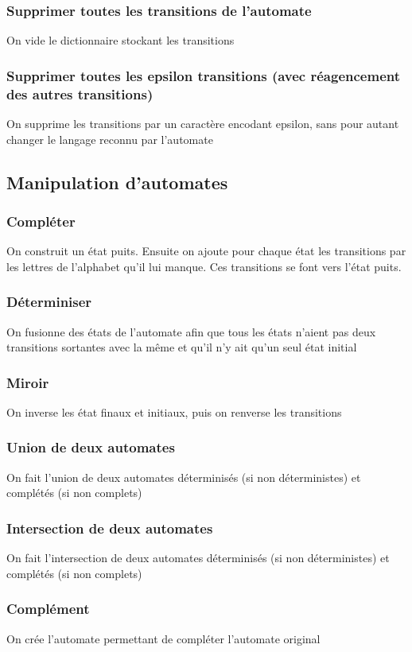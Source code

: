\documentclass[a4paper, 12pt]{report}
\begin{document}
\subsubsection*{Supprimer toutes les transitions de l'automate}
On vide le dictionnaire stockant les transitions
\subsubsection*{Supprimer toutes les epsilon transitions (avec réagencement des autres transitions)}
On supprime les transitions par un caractère encodant epsilon, sans pour autant changer le langage reconnu par l'automate

\subsection{Manipulation d'automates}
\subsubsection{Compléter}
On construit un état puits. Ensuite on ajoute pour chaque état les transitions par les lettres de l'alphabet qu'il lui manque. Ces transitions se font vers l'état puits.
\subsubsection{Déterminiser}
On fusionne des états de l'automate afin que tous les états n'aient pas deux transitions sortantes avec la même et qu'il n'y ait qu'un seul état initial
\subsubsection{Miroir}
On inverse les état finaux et initiaux, puis on renverse les transitions
\subsubsection{Union de deux automates}
On fait l'union de deux automates déterminisés (si non déterministes) et complétés (si non complets)
\subsubsection{Intersection de deux automates}
On fait l'intersection de deux automates déterminisés (si non déterministes) et complétés (si non complets)
\subsubsection{Complément}
On crée l'automate permettant de compléter l'automate original
\end{document}
